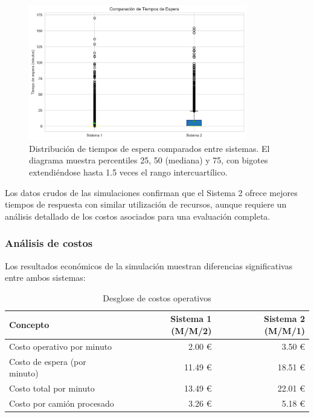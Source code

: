 \documentclass[a4paper, 12pt]{article}
\begin{document}
  \begin{figure}[H]
  	\centering
  	\includegraphics[width=0.85\textwidth]{figures/boxplot_comparison.png}
  	\caption{Distribución de tiempos de espera comparados entre sistemas. El diagrama muestra percentiles 25, 50 (mediana) y 75, con bigotes extendiéndose hasta 1.5 veces el rango intercuartílico.}
  	\label{fig:boxplot}
  \end{figure}
  
  Los datos crudos de las simulaciones confirman que el Sistema 2 ofrece mejores tiempos de respuesta con similar utilización de recursos, aunque requiere un análisis detallado de los costos asociados para una evaluación completa.
  
  \subsubsection{Análisis de costos}
  
  Los resultados económicos de la simulación muestran diferencias significativas entre ambos sistemas:
  
  \begin{table}[H]
  	\centering
  	\begin{tabular}{lrr}
  		\toprule
  		\textbf{Concepto} & \textbf{Sistema 1 (M/M/2)} & \textbf{Sistema 2 (M/M/1)} \\
  		\midrule
  		Costo operativo por minuto & 2.00 € & 3.50 € \\
  		Costo de espera (por minuto) & 11.49 € & 18.51 € \\
  		Costo total por minuto & 13.49 € & 22.01 € \\
  		Costo por camión procesado & 3.26 € & 5.18 € \\
  		\bottomrule
  	\end{tabular}
  	\caption{Desglose de costos operativos}
  	\label{tab:costos}
  \end{table}
  
\end{document}
